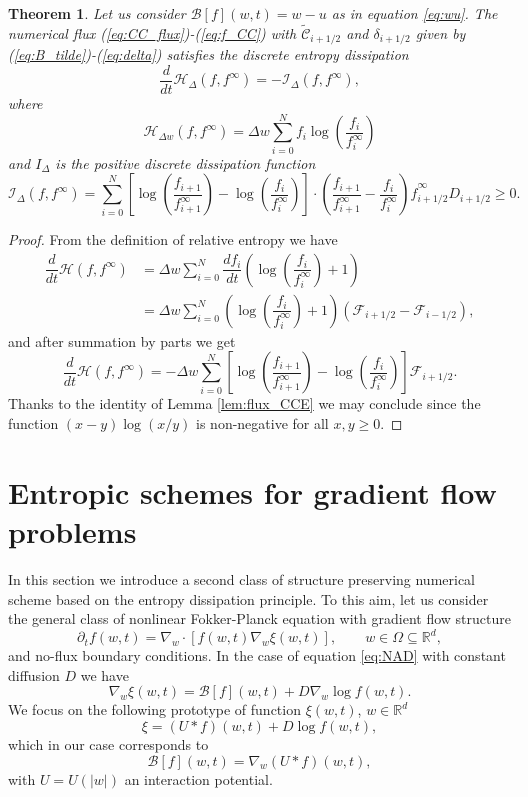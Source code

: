 \documentclass[a4paper]{article}
\newtheorem{theorem}{Theorem}
\theoremstyle{remark}\newtheorem{remark}{Remark}
\newcommand{\RR}{\mathbb{R}}
\newcommand{\F}{\mathcal{F}}
\newcommand{\B}{\mathcal{B}}
\newcommand{\C}{\mathcal{C}}
\newcommand{\be}{\begin{equation}}
\newcommand{\ee}{\end{equation}}
\begin{document}
\begin{theorem}\label{th:1}
Let us consider $\B[f](w,t)=w-u$ as in equation \eqref{eq:wu}. The numerical flux (\ref{eq:CC_flux})-(\ref{eq:f_CC}) with $\tilde{\C}_{i+1/2}$ and $\delta_{i+1/2}$ given by (\ref{eq:B_tilde})-(\ref{eq:delta}) satisfies the discrete entropy dissipation
\be
\dfrac{d}{dt}\mathcal H_{\Delta}(f,f^{\infty})=-\mathcal I_{\Delta}(f,f^{\infty}),
\ee
where
\be\label{eq:relative_entropy}
\mathcal H_{\Delta w}(f,f^{\infty}) = \Delta w \sum_{i=0}^N f_i \log \left(\dfrac{f_i}{f_i^{\infty}} \right)
\ee
and $I_{\Delta}$ is the positive discrete dissipation function 
\be
\mathcal I_{\Delta}(f,f^{\infty}) = \sum_{i=0}^N
 \left[ \log \left(\dfrac{f_{i+1}}{f^{\infty}_{i+1}}\right)-\log\left(\dfrac{f_i}{f_i^{\infty}}\right) \right]\cdot \left(\dfrac{f_{i+1}}{f_{i+1}^{\infty}}-\dfrac{f_i}{f_{i}^{\infty}}\right)\hat{f}_{i+1/2}^{\infty}D_{i+1/2}\ge 0.
\ee
\end{theorem}
\begin{proof}
From the definition of relative entropy we have
\[
\begin{split}
\dfrac{d}{dt} \mathcal H(f,f^{\infty})&= \Delta w\sum_{i=0}^N  \dfrac{df_i}{dt}\left(\log\left(\dfrac{f_i}{f_i^{\infty}}\right)+1\right)\\
&= \Delta w \sum_{i=0}^N \left( \log\left(\dfrac{f_i}{f_i^{\infty}}\right)+1 \right)(\F_{i+1/2}-\F_{i-1/2}),
\end{split}
\]
and after summation by parts we get
\be
\dfrac{d}{dt} \mathcal H(f,f^{\infty})=-\Delta w \sum_{i=0}^N \left[ \log \left(\dfrac{f_{i+1}}{f_{i+1}^{\infty}}\right)-\log\left(\dfrac{f_i}{f_i^{\infty}}\right) \right]\F_{i+1/2}.
\ee
Thanks to the identity of Lemma \ref{lem:flux_CCE}  we may conclude since the function $(x-y)\log(x/y)$ is non-negative for all $x,y\ge 0$.
\end{proof}

\section{Entropic schemes for gradient flow problems}
In this section we introduce a second class of structure preserving numerical scheme based on the entropy dissipation principle.
To this aim, let us consider the general class of nonlinear Fokker-Planck equation with 
gradient flow structure \cite{BCCD,CCH,CMV}
\be\label{eq:gradient_2}
\partial_t f(w,t) = \nabla_w \cdot [f(w,t)\nabla_w\xi(w,t)], \qquad w\in\Omega\subseteq\RR^d,
\ee
and no-flux boundary conditions. In the case of equation \eqref{eq:NAD} with constant diffusion $D$ 
we have
\be
\nabla_w \xi(w,t) = {\B}[f](w,t) + D {\nabla_w \log f(w,t)}.
\label{eq:xi}
\ee
We focus on the following prototype of function $\xi(w,t)$, $w\in\RR^d$ 
\be\label{eq:xi_2}
\xi = (U*f)(w,t)+D\log f(w,t),
\ee
which in our case corresponds to
\[
{\B}[f] (w,t)=\nabla_w (U*f)(w,t),
\]
with $U=U(|w|)$ an interaction potential.
\end{document}
